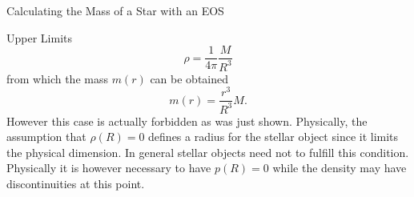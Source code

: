 \begin{section}{Calculating the Mass of a Star with an EOS}
\begin{subsection}{Upper Limits}
\begin{equation}
	\rho = \frac{1}{4\pi}\frac{M}{R^3}
\end{equation}
from which the mass $m(r)$ can be obtained
\begin{equation}
	m(r) = \frac{r^3}{R^3}M.
\end{equation}
However this case is actually forbidden as was just shown. Physically, the assumption that $\rho(R)=0$ defines a radius for the stellar object since it limits the physical dimension. In general stellar objects need not to fulfill this condition. Physically it is however necessary to have $p(R)=0$ while the density may have discontinuities at this point.
\end{subsection}
%
%
\end{section}
 
